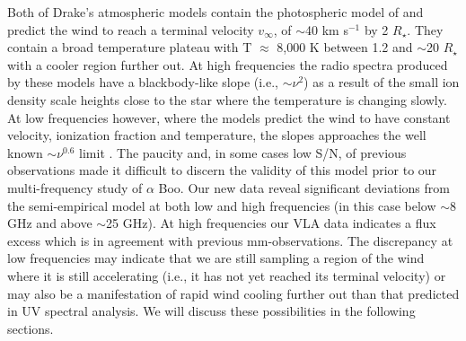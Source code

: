 \documentclass[iop]{emulateapj}
\begin{document}
Both of Drake's atmospheric models contain the photospheric model of \cite{1975ApJ...200..660A} and predict the wind to reach a terminal velocity $v_{\infty}$, of $\sim$40 km s${}^{-1}$ by 2 $R _{\star}$. They contain a broad temperature plateau with T $\approx$ 8,000 K between 1.2 and $\sim$20 $R _{\star}$ with a cooler region further out. At high frequencies the radio spectra produced by these models have a blackbody-like slope (i.e., $\sim\nu ^{2}$) as a result of the small ion density scale heights close to the star where the temperature is changing slowly. At low frequencies however, where the models predict the wind to have constant velocity, ionization fraction and temperature, the slopes approaches the well known $\sim\nu ^{0.6}$ limit \citep{1975MNRAS.170...41W,1975AA....39..217O,1975AA....39....1P}. The paucity and, in some cases low S/N, of previous observations made it difficult to discern the validity of this model prior to our multi-frequency study of $\alpha$ Boo. Our new data reveal significant deviations from the semi-empirical model at both low and high frequencies (in this case below $\sim$8 GHz and above $\sim$25 GHz). At high frequencies our VLA data indicates a flux excess which is in agreement with previous mm-observations. The  discrepancy at low frequencies may indicate that we are still sampling a region of the wind where it is still accelerating (i.e., it has not yet reached its terminal velocity) or may also be a manifestation of rapid wind cooling further out than that predicted in UV spectral analysis. We will discuss these possibilities in the following sections.
\end{document}

